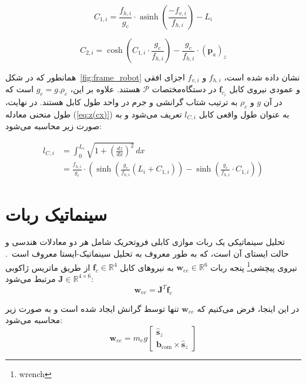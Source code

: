 \begin{equation}  \label{eq:C1}
	C_{1,i} = \frac{f_{h,i}}{g_c} \cdot \operatorname{asinh} \left( \frac{-f_{v,i}}{f_{h,i}} \right) - L_i  
\end{equation}

\begin{equation}  \label{eq:C2}
	C_{2,i} = \cosh \left(C_{1,i} \cdot \frac{g_c}{f_{h,i}} \right) - \frac{g_c}{f_{h,i}} \cdot (\bm{p}_a)_z
\end{equation}

همانطور که در شکل~\ref{fig:frame_robot} نشان داده شده است، $f_{h,i}$ و $f_{v,i}$ اجزای افقی و عمودی نیروی کابل $\mathbf{f}_{c_i}$ در دستگاه‌مختصات $\mathcal{P}$ هستند. علاوه بر این، $g_c=g.\rho_c$ است که در آن $g$ و $\rho_c$ به ترتیب شتاب گرانشی و جرم در واحد طول کابل هستند. در نهایت، طول منحنی معادله (\ref{eq:z(cx)}) به عنوان طول واقعی کابل $l_{C,i}$ تعریف می‌شود و به صورت زیر محاسبه می‌شود:

\begin{equation}  \label{eq:lcat}
	\begin{aligned}
		l_{C,i} &= \int_0^{L_i} \sqrt{1 + \left(\frac{dz}{dx}\right)^2} \, dx \\ &= \frac{f_{h,i}}{g_c} \cdot \left( \sinh \left( \frac{g_c}{f_{h,i}} (L_i + C_{1,i}) \right) - \sinh \left( \frac{g_c}{f_{h,i}} \cdot C_{1,i} \right) \right) 
	\end{aligned}
\end{equation}


\section{سینماتیک ربات}   
تحلیل سینماتیکی یک ربات موازی کابلی فروتحریک شامل هر دو معادلات هندسی و حالت ایستای آن است، که به طور معروف به تحلیل سینماتیک-ایستا معروف است~\cite{carricato2013direct}. نیروی پیچشی\footnote{wrench}
 پنجه ربات
 $\mathbf{w}_{ee} \in \mathbb{R}^6$ 
به نیروهای کابل $\mathbf{f}_c \in \mathbb{R}^4 $ از طریق ماتریس ژاکوبی $\bm{J} \in \mathbb{R}^{4\times6}$ مرتبط می‌شود:
\begin{equation} \label{eq:static}
	\mathbf{w}_{ee} = \bm{J}^T \mathbf{f}_{c}  
\end{equation}


در این اینجا، فرض می‌کنیم که $\mathbf{w}_{ee}$ تنها توسط گرانش ایجاد شده است و به صورت زیر محاسبه می‌شود:
\begin{equation} \label{eq:example}
	\mathbf{w}_{ee} = m_{e}g \begin{bmatrix} \hat{\bm{s}}_z \\ \bm{b}_{\text{com}} \times \hat{\bm{s}}_z \end{bmatrix}
\end{equation}

